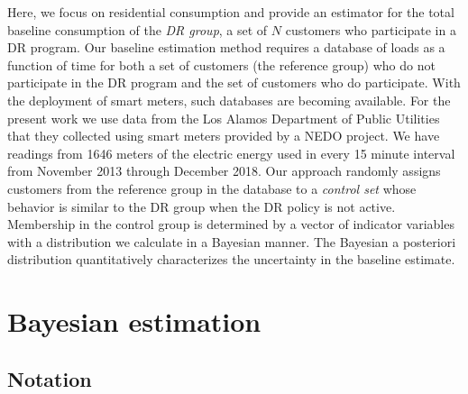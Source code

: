 \documentclass[journal]{IEEEtran}
\begin{document}
Here, we focus on residential consumption and provide an estimator for
the total baseline consumption of the \emph{DR group}, a set of $N$
customers who participate in a DR program.  Our baseline estimation
method requires a database of loads as a function of time for both a
set of customers (the reference group) who do not participate in the
DR program and the set of customers who do participate.  With the
deployment of smart meters, such databases are becoming available.
For the present work we use data from the Los Alamos Department of
Public Utilities that they collected using smart meters provided by a
NEDO project\cite{nedo}.  We have readings from 1646 meters of the
electric energy used in every 15 minute interval from November 2013
through December 2018.  Our approach randomly assigns customers from
the reference group in the database to a \emph{control set} whose
behavior is similar to the DR group when the DR policy is not active.
Membership in the control group is determined by a vector of indicator
variables with a distribution we calculate in a Bayesian manner.  The
Bayesian a posteriori distribution quantitatively characterizes the
uncertainty in the baseline estimate.

\section{Bayesian estimation}
\label{sec:new}

\subsection{Notation}
\label{sec:notation}
\end{document}
